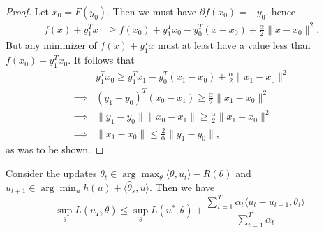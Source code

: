\documentclass{article}
\begin{document}
\begin{proof}
Let $x_0 = F(y_0)$. Then we must have $\partial f(x_0) = -y_0$, hence 
\begin{align*}
f(x)+y_1^Tx &\geq f(x_0) + y_1^Tx_0 - y_0^T(x-x_0) + \frac{\alpha}{2}\|x-x_0\|^2.
\end{align*}
But any minimizer of $f(x) + y_1^Tx$ must at least have a value less than $f(x_0) + y_1^Tx_0$. 
It follows that 
\begin{align*}
         & y_1^Tx_0 \geq y_1^Tx_1 - y_0^T(x_1-x_0) + \frac{\alpha}{2}\|x_1-x_0\|^2 \\
\implies & (y_1-y_0)^T(x_0-x_1) \geq \frac{\alpha}{2}\|x_1-x_0\|^2 \\
\implies & \|y_1-y_0\|\|x_0-x_1\| \geq \frac{\alpha}{2}\|x_1-x_0\|^2 \\
\implies & \|x_1-x_0\| \leq \frac{2}{\alpha} \|y_1-y_0\|,
\end{align*}
as was to be shown.
\end{proof}
\begin{proposition}
\label{prop:method-1}
Consider the updates $\theta_t \in \arg\max_{\theta} \langle \theta, u_t \rangle - R(\theta)$ 
and $u_{t+1} \in \arg\min_u h(u) + \langle \hat{\theta}_s, u \rangle$. 
Then we have
\[ \sup_{\theta} L(\hat{u}_T, \theta) \leq \sup_{\theta} L(u^*, \theta) + \frac{\sum_{t=1}^T \alpha_t \langle u_t - u_{t+1}, \theta_t \rangle}{\sum_{t=1}^T \alpha_t}. \]
\end{proposition}
\end{document}
